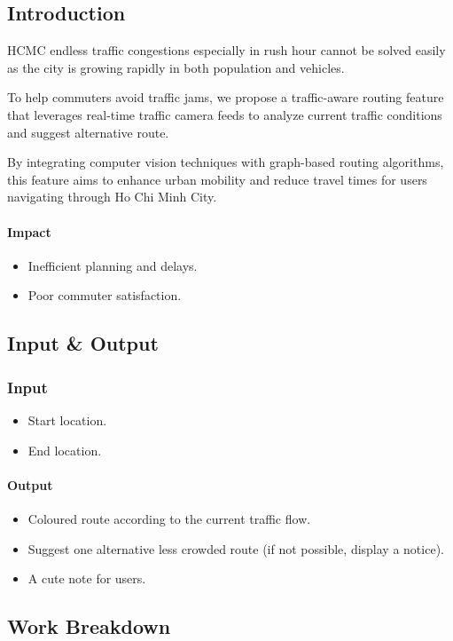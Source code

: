 \subsection{Introduction}
HCMC endless traffic congestions especially in rush hour cannot be solved easily as the city is growing rapidly in both population and vehicles. 

To help commuters avoid traffic jams, we propose a traffic-aware routing feature that leverages real-time traffic camera feeds to analyze current traffic conditions and suggest alternative route. 

By integrating computer vision techniques with graph-based routing algorithms, this feature aims to enhance urban mobility and reduce travel times for users navigating through Ho Chi Minh City.
\paragraph{Impact}
\begin{itemize}
  \item Inefficient planning and delays.
  \item Poor commuter satisfaction.
\end{itemize}   

\subsection{Input \& Output}
\subsubsection{Input}
\begin{itemize}
  \item Start location.
  \item End location.
\end{itemize}

\paragraph{Output}
\begin{itemize}
  \item Coloured route according to the current traffic flow.
  \item Suggest one alternative less crowded route (if not possible, display a notice).
  \item A cute note for users.
\end{itemize}

\subsection{Work Breakdown}
